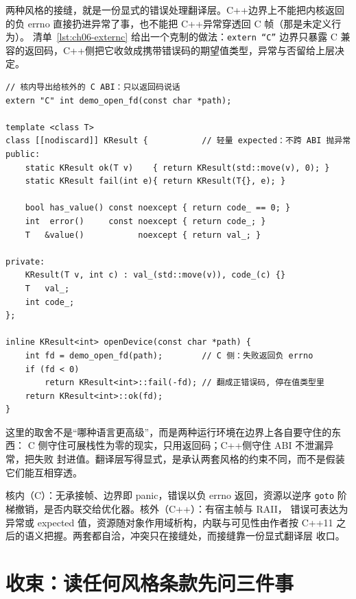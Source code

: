 \documentclass[12pt,a4paper,fontset=fandol]{ctexbook}
\newcommand{\cpp}[1]{C++#1}
\newcommand{\Tp}[1]{\texttt{#1}}
\newcommand{\Lang}[1]{\textsf{#1}}
\newcommand{\CPP}{\Lang{C++}}
\begin{document}
两种风格的接缝，就是一份显式的错误处理翻译层。\CPP 边界上不能把内核返回的负
errno 直接扔进异常了事，也不能把 \CPP 异常穿透回 \Lang{C} 帧（那是未定义行为）。
清单~\ref{lst:ch06-externc} 给出一个克制的做法：\Tp{extern ``C''} 边界只暴露
C 兼容的返回码，\CPP 侧把它收敛成携带错误码的期望值类型，异常与否留给上层决
定。

\begin{lstlisting}[style=cppstyle,caption={extern ``C'' 边界上的 errno 到期望值翻译层：越界处只走返回码，语义在 C++ 侧收敛},label={lst:ch06-externc}]
// 核内导出给核外的 C ABI：只以返回码说话
extern "C" int demo_open_fd(const char *path);

template <class T>
class [[nodiscard]] KResult {           // 轻量 expected：不跨 ABI 抛异常
public:
    static KResult ok(T v)    { return KResult(std::move(v), 0); }
    static KResult fail(int e){ return KResult(T{}, e); }

    bool has_value() const noexcept { return code_ == 0; }
    int  error()     const noexcept { return code_; }
    T   &value()           noexcept { return val_; }

private:
    KResult(T v, int c) : val_(std::move(v)), code_(c) {}
    T   val_;
    int code_;
};

inline KResult<int> openDevice(const char *path) {
    int fd = demo_open_fd(path);        // C 侧：失败返回负 errno
    if (fd < 0)
        return KResult<int>::fail(-fd); // 翻成正错误码, 停在值类型里
    return KResult<int>::ok(fd);
}
\end{lstlisting}

这里的取舍不是``哪种语言更高级''，而是两种运行环境在边界上各自要守住的东西：
\Lang{C} 侧守住可展栈性为零的现实，只用返回码；\CPP 侧守住 ABI 不泄漏异常，把失败
封进值。翻译层写得显式，是承认两套风格的约束不同，而不是假装它们能互相穿透。

\begin{compare}[title={核内 vs 核外：同一设备的两套错误处理}]
核内（\Lang{C}）：无承接帧、边界即 panic，错误以负 errno 返回，资源以逆序
\Tp{goto} 阶梯撤销，是否内联交给优化器。核外（\CPP）：有宿主帧与 RAII，
错误可表达为异常或 expected 值，资源随对象作用域析构，内联与可见性由作者按
\cpp{11} 之后的语义把握。两套都自洽，冲突只在接缝处，而接缝靠一份显式翻译层
收口。
\end{compare}

\section{收束：读任何风格条款先问三件事}
\label{sec:ch06-three-questions}
\end{document}
